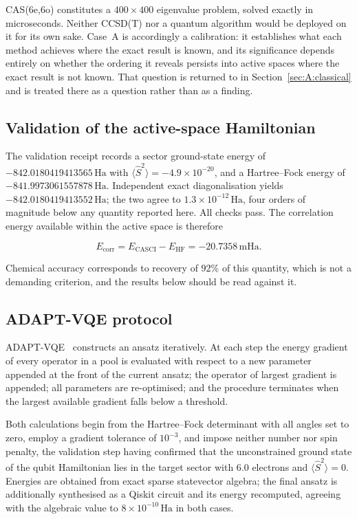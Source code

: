 \documentclass[11pt,a4paper]{article}
\newcommand{\mHa}{\ensuremath{\,\mathrm{mHa}}}
\newcommand{\Ha}{\ensuremath{\,\mathrm{Ha}}}
\newcommand{\Ssq}{\ensuremath{\langle \hat{S}^2 \rangle}}
\begin{document}
\begin{caution}
CAS(6e,6o) constitutes a $400 \times 400$ eigenvalue problem, solved exactly in
microseconds. Neither CCSD(T) nor a quantum algorithm would be deployed on it
for its own sake. Case~A is accordingly a calibration: it establishes what each
method achieves where the exact result is known, and its significance depends
entirely on whether the ordering it reveals persists into active spaces where
the exact result is not known. That question is returned to in
Section~\ref{sec:A:classical} and is treated there as a question rather than as
a finding.
\end{caution}

\subsection{Validation of the active-space Hamiltonian}

The validation receipt records a sector ground-state energy of
$-842.0180419413565\Ha$ with $\Ssq = -4.9 \times 10^{-20}$, and a
Hartree--Fock energy of $-841.9973061557878\Ha$. Independent exact
diagonalisation yields $-842.0180419413552\Ha$; the two agree to
$1.3 \times 10^{-12}\Ha$, four orders of magnitude below any quantity reported
here. All checks pass. The correlation energy available within the active space
is therefore

\[
E_{\text{corr}} = E_{\text{CASCI}} - E_{\text{HF}} = -20.7358\mHa .
\]

Chemical accuracy corresponds to recovery of $92\%$ of this quantity, which is
not a demanding criterion, and the results below should be read against it.

\subsection{ADAPT-VQE protocol}

ADAPT-VQE~\cite{adapt} constructs an ansatz iteratively. At each step the
energy gradient of every operator in a pool is evaluated with respect to a new
parameter appended at the front of the current ansatz; the operator of largest
gradient is appended; all parameters are re-optimised; and the procedure
terminates when the largest available gradient falls below a threshold.

Both calculations begin from the Hartree--Fock determinant with all angles set
to zero, employ a gradient tolerance of $10^{-3}$, and impose neither number
nor spin penalty, the validation step having confirmed that the unconstrained
ground state of the qubit Hamiltonian lies in the target sector with 6.0
electrons and $\Ssq = 0$. Energies are obtained from exact sparse statevector
algebra; the final ansatz is additionally synthesised as a Qiskit circuit and
its energy recomputed, agreeing with the algebraic value to
$8 \times 10^{-10}\Ha$ in both cases.
\end{document}
